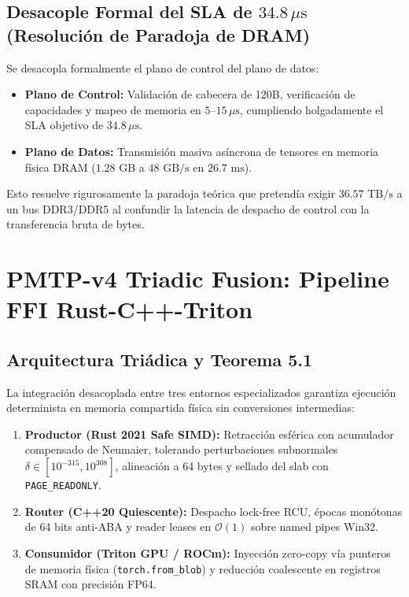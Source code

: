 \subsection{Desacople Formal del SLA de $34.8\,\mu\text{s}$ (Resolución de Paradoja de DRAM)}
Se desacopla formalmente el plano de control del plano de datos:
\begin{itemize}
    \item \textbf{Plano de Control:} Validación de cabecera de 120B, verificación de capacidades y mapeo de memoria en $5\text{--}15\,\mu\text{s}$, cumpliendo holgadamente el SLA objetivo de $34.8\,\mu\text{s}$.
    \item \textbf{Plano de Datos:} Transmisión masiva asíncrona de tensores en memoria física DRAM ($1.28\text{ GB}$ a $48\text{ GB/s}$ en $26.7\text{ ms}$).
\end{itemize}
Esto resuelve rigurosamente la paradoja teórica que pretendía exigir $36.57\text{ TB/s}$ a un bus DDR3/DDR5 al confundir la latencia de despacho de control con la transferencia bruta de bytes.

\section{PMTP-v4 Triadic Fusion: Pipeline FFI Rust-C++-Triton}
\subsection{Arquitectura Triádica y Teorema 5.1}
La integración desacoplada entre tres entornos especializados garantiza ejecución determinista en memoria compartida física sin conversiones intermedias:
\begin{enumerate}
    \item \textbf{Productor (Rust 2021 Safe SIMD):} Retracción esférica con acumulador compensado de Neumaier, tolerando perturbaciones subnormales $\delta \in [10^{-315}, 10^{308}]$, alineación a 64 bytes y sellado del slab con \texttt{PAGE\_READONLY}.
    \item \textbf{Router (C++20 Quiescente):} Despacho lock-free RCU, épocas monótonas de 64 bits anti-ABA y reader leases en $\mathcal{O}(1)$ sobre named pipes Win32.
    \item \textbf{Consumidor (Triton GPU / ROCm):} Inyección zero-copy vía punteros de memoria física (\texttt{torch.from\_blob}) y reducción coalescente en registros SRAM con precisión FP64.
\end{enumerate}

